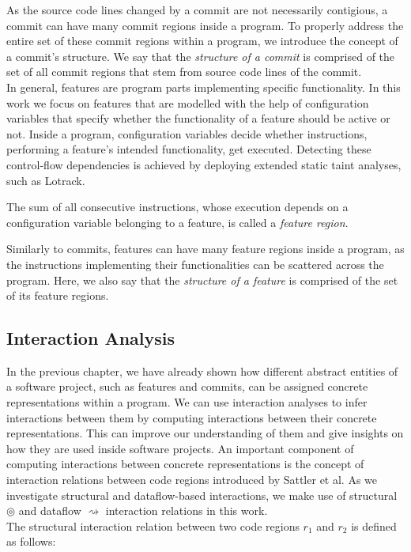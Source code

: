 As the source code lines changed by a commit are not necessarily contigious,
a commit can have many commit regions inside a program. 
To properly address the entire set of these commit regions within a program, we introduce the concept of a commit's structure.
We say that the \emph{structure of a commit} is comprised of the set of all commit regions that stem from source code lines of the commit. \\

In general, features are program parts implementing specific functionality.
In this work we focus on features that are modelled with the help of configuration variables that specify whether the functionality of a feature should be active or not.
Inside a program, configuration variables decide whether instructions, performing a feature's intended functionality, get executed. 
Detecting these control-flow dependencies is achieved by deploying extended static taint analyses, such as Lotrack.

\begin{definition} 
	The sum of all consecutive instructions, whose execution depends on a configuration variable belonging to a feature, is called a \emph{feature region}. 
\end{definition}

Similarly to commits, features can have many feature regions inside a program,
as the instructions implementing their functionalities can be scattered across the program.
Here, we also say that the \emph{structure of a feature} is comprised of the set of its feature regions. \\ 

\subsection*{Interaction Analysis}

In the previous chapter, we have already shown how different abstract entities of a software project, such as features and commits, can be assigned concrete representations within a program.
We can use interaction analyses to infer interactions between them by computing interactions between their concrete representations.
This can improve our understanding of them and give insights on how they are used inside software projects. 
An important component of computing interactions between concrete representations is the concept of interaction relations between code regions introduced by Sattler et al.
As we investigate structural and dataflow-based interactions, we make use of structural $\circledcirc$ and dataflow $\rightsquigarrow$ interaction relations in this work. \\
The structural interaction relation between two code regions $r_1$ and $r_2$ is defined as follows:

